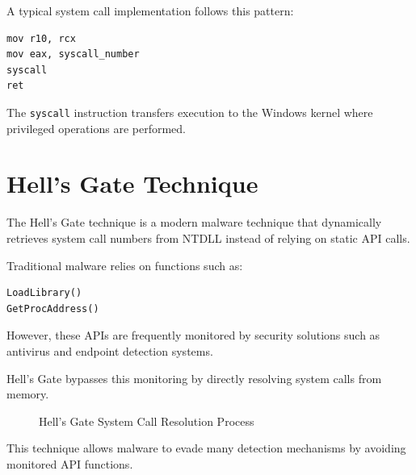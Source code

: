 A typical system call implementation follows this pattern:

\begin{lstlisting}
mov r10, rcx
mov eax, syscall_number
syscall
ret
\end{lstlisting}

The \texttt{syscall} instruction transfers execution to the Windows kernel where privileged operations are performed.

\section{Hell's Gate Technique}

The Hell's Gate technique is a modern malware technique that dynamically retrieves system call numbers from 
NTDLL instead of relying on static API calls.

Traditional malware relies on functions such as:

\begin{verbatim}
LoadLibrary()
GetProcAddress()
\end{verbatim}

However, these APIs are frequently monitored by security solutions such as antivirus and endpoint detection systems.

Hell's Gate bypasses this monitoring by directly resolving system calls from memory.

\begin{figure}[H]
\centering
{}
\caption{Hell's Gate System Call Resolution Process}
\end{figure}

This technique allows malware to evade many detection mechanisms by avoiding monitored API functions.

